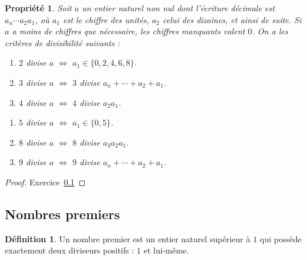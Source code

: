 \documentclass[12pt,a4paper]{article}
\theoremstyle{plain}
\newtheorem{property}[theorem]{Propriété}
\theoremstyle{definition}
\newtheorem{definition}[theorem]{Définition}
\theoremstyle{remark}
\begin{document}
\begin{tcolorbox}[graybar]
\begin{property}
  \label{prop:div_rules}%
  Soit $a$ un entier naturel non nul dont l'écriture décimale est
  $a_n \cdots a_2a_1$, où $a_1$ est le chiffre des unités, $a_2$ celui
  des dizaines, et ainsi de suite. Si $a$ a moins de chiffres que
  nécessaire, les chiffres manquants valent $0$. On a les critères de
  divisibilité suivants :

  \noindent
  \begin{minipage}[t]{0.49\linewidth}
    \begin{enumerate}[label=(\alph*)]
      \item $2$ divise $a$ $\Longleftrightarrow$ $a_1 \in \{0,2,4,6,8\}$.
      \item $3$ divise $a$ $\Longleftrightarrow$ $3$ divise $a_n+\cdots+a_2+a_1$.
      \item $4$ divise $a$ $\Longleftrightarrow$ $4$ divise $a_2a_1$.
    \end{enumerate}
  \end{minipage}%
  \hfill
  \begin{minipage}[t]{0.49\linewidth}
    \begin{enumerate}[label=(\alph*),start=4]
      \item $5$ divise $a$ $\Longleftrightarrow$ $a_1 \in \{0,5\}$.
      \item $8$ divise $a$ $\Longleftrightarrow$ $8$ divise $a_3a_2a_1$.
      \item $9$ divise $a$ $\Longleftrightarrow$ $9$ divise $a_n+\cdots+a_2+a_1$.
    \end{enumerate}
  \end{minipage}
\end{property}
\end{tcolorbox}

\begin{proof}
  Exercice~\ref{}
\end{proof}

\subsection{Nombres premiers}

\begin{tcolorbox}[navybar]
\begin{definition}
  Un nombre premier est un entier naturel supérieur à $1$ qui possède
  exactement deux diviseurs positifs : $1$ et lui-même.
\end{definition}
\end{tcolorbox}
\end{document}
